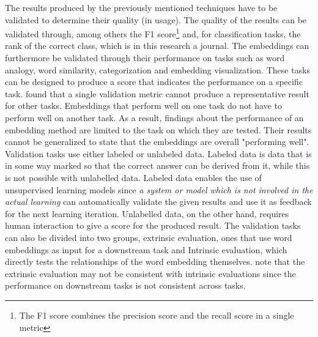\documentclass[../../Thesis.tex]{subfiles}
\begin{document}
The results produced by the previously mentioned techniques have to be validated to determine their quality (in usage). The quality of the results can be validated through, among others the F1 score\footnote{The F1 score combines the precision score and the recall score in a single metric} and, for classification tasks, the rank of the correct class, which is in this research a journal. The embeddings can furthermore be validated through their performance on tasks such as word analogy, word similarity, categorization and embedding visualization. These tasks can be designed to produce a score that indicates the performance on a specific task. \citet{schnabel2015evaluation} found that a single validation metric cannot produce a representative result for other tasks. Embeddings that perform well on one task do not have to perform well on another task. As a result, findings about the performance of an embedding method are limited to the task on which they are tested. Their results cannot be generalized to state that the embeddings are overall "performing well". Validation tasks use either labeled or unlabeled data. Labeled data is data that is in some way marked so that the correct answer can be derived from it, while this is not possible with unlabelled data. Labeled data enables the use of unsupervised learning models since  \textit{a system or model which is not involved in the actual learning} can automatically validate the given results and use it as feedback for the next learning iteration. Unlabelled data, on the other hand, requires human interaction to give a score for the produced result. The validation tasks can also be divided into two groups, extrinsic evaluation, ones that use word embeddings as input for a downstream task and Intrinsic evaluation, which directly tests the relationships of the word embedding themselves. \citet{schnabel2015evaluation} note that the extrinsic evaluation may not be consistent with intrinsic evaluations since the performance on downstream tasks is not consistent across tasks.
\end{document}
